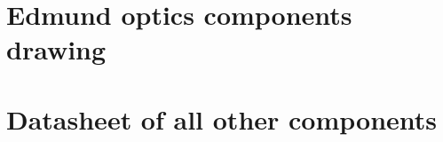 \chapter{Edmund optics components drawing}

\newpage

\newpage

\newpage

\newpage

\newpage

\chapter{Datasheet of all other components}

\newpage